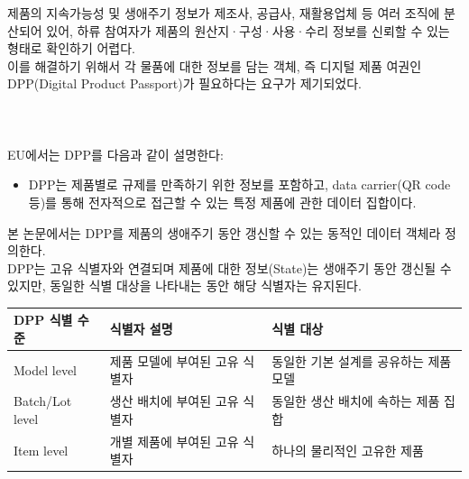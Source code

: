 \documentclass[11pt,a4paper]{extarticle}
\begin{document}
제품의 지속가능성 및 생애주기 정보가 제조사, 공급사, 재활용업체 등 여러 조직에 분산되어 있어,
하류 참여자가 제품의 원산지·구성·사용·수리 정보를 신뢰할 수 있는 형태로 확인하기 어렵다. \\

이를 해결하기 위해서 각 물품에 대한 정보를 담는 객체, 즉 디지털 제품 여권인 DPP(Digital Product Passport)가 필요하다는 요구가 제기되었다. \\\\\\\\

EU에서는 DPP를 다음과 같이 설명한다:

\begin{itemize}
  \item DPP는 제품별로 규제를 만족하기 위한 정보를 포함하고, data carrier(QR code 등)를 통해
        전자적으로 접근할 수 있는 특정 제품에 관한 데이터 집합이다.
\end{itemize}

본 논문에서는 DPP를 제품의 생애주기 동안 갱신할 수 있는 동적인 데이터 객체라 정의한다.  \\

DPP는 고유 식별자와 연결되며 제품에 대한 정보(State)는 생애주기 동안 갱신될 수 있지만, 동일한 식별 대상을 나타내는 동안 해당 식별자는 유지된다.

\begin{center}
  \renewcommand{\arraystretch}{1.35}
  \setlength{\tabcolsep}{8pt}
  \begin{tabularx}{\textwidth}{
      @{}
      >{\raggedright\arraybackslash}p{28mm}
      >{\raggedright\arraybackslash}X
      >{\raggedright\arraybackslash}X
      @{}
    }
    \toprule
    \textbf{DPP 식별 수준} & \textbf{식별자 설명}       & \textbf{식별 대상} \\
    \midrule
    Model level
                       & 제품 모델에 부여된 고유 식별자
                       & 동일한 기본 설계를 공유하는 제품 모델                  \\
    Batch/Lot level
                       & 생산 배치에 부여된 고유 식별자
                       & 동일한 생산 배치에 속하는 제품 집합                   \\
    Item level
                       & 개별 제품에 부여된 고유 식별자
                       & 하나의 물리적인 고유한 제품                        \\
    \bottomrule
  \end{tabularx}
\end{center}
\end{document}
